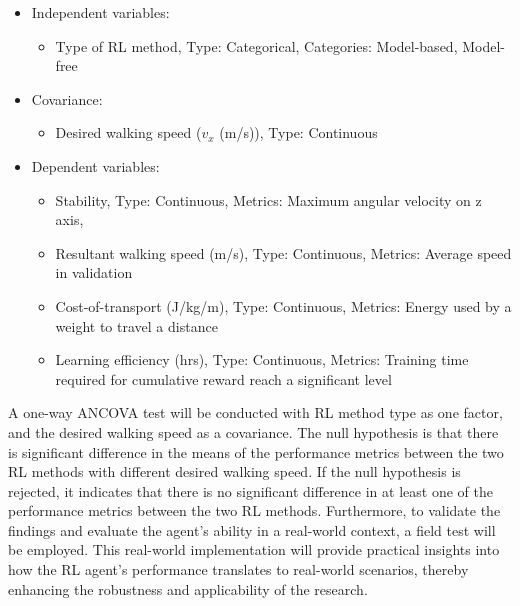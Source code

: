 \begin{itemize}
    \item Independent variables: 
    \begin{itemize}
        \item Type of RL method, Type: Categorical, Categories: Model-based, Model-free
    \end{itemize}
    \item Covariance:
    \begin{itemize}
        \item Desired walking speed ($v_x$ (m/s)), Type: Continuous
    \end{itemize}
    \item Dependent variables:
    \begin{itemize}
        \item Stability, Type: Continuous, Metrics: Maximum angular velocity on z axis, 
        \item Resultant walking speed (m/s), Type: Continuous, Metrics: Average speed in validation
        \item Cost-of-transport (J/kg/m), Type: Continuous, Metrics: Energy used by a weight to travel a distance
        \item Learning efficiency (hrs), Type: Continuous, Metrics: Training time required for cumulative reward reach a significant level
    \end{itemize}
\end{itemize}
A one-way \ac{ANCOVA} test will be conducted with \ac{RL} method type as one factor, and the desired walking speed as a covariance. The null hypothesis is that there is significant difference in the means of the performance metrics between the two RL methods with different desired walking speed. If the null hypothesis is rejected, it indicates that there is no significant difference in at least one of the performance metrics between the two RL methods. Furthermore, to validate the findings and evaluate the agent's ability in a real-world context, a field test will be employed. This real-world implementation will provide practical insights into how the RL agent's performance translates to real-world scenarios, thereby enhancing the robustness and applicability of the research. 